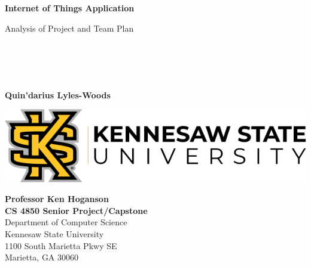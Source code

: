 \begin{titlepage}
\begin{center}
	\vspace*{1cm}

	\Huge
	\textbf{Internet of Things Application}

	\vspace{0.5cm}
	\LARGE
	Analysis of Project and Team Plan

	\vspace{1.5cm}
    \Large

	\textbf{}\\
	\textbf{}\\
	\textbf{}\\
	\textbf{}\\
	\textbf{Quin'darius Lyles-Woods}\\
    

	\vfill
	\LARGE
	\vspace{0.8cm}

	\includegraphics[width=\textwidth]{kennesawlogo}

	\vspace{0.8cm}

	\Large
	\textbf{Professor Ken Hoganson} 			\\
    \textbf{CS 4850 Senior Project/Capstone} \\
	Department of Computer Science   \\
	Kennesaw State University       \\
	1100 South Marietta Pkwy SE     \\
	Marietta, GA 30060              \\

	\vspace{1cm}

\end{center}
\end{titlepage}
